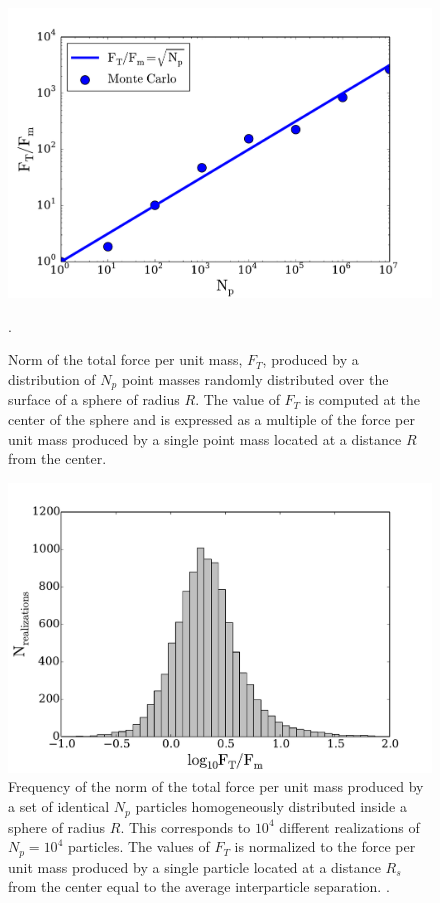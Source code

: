 \documentclass{article}
\begin{document}
\begin{figure}
\begin{center}
\includegraphics[width=0.80\linewidth,angle=0]{spheres_surface.pdf}
\caption{Norm of the total force per unit mass, $F_{T}$, produced by a
  distribution of $N_p$ point masses randomly distributed over the
  surface of a sphere of radius $R$. The value
  of $F_T$ is  computed at the center of the sphere and is  expressed
  as a multiple  of the force per unit mass produced by a  single
  point mass located  at a distance $R$ from the
  center. \label{fig:sphere_surface}}. 
\end{center}
\end{figure}


\begin{figure}
\begin{center}
\includegraphics[width=0.8\linewidth,angle=0]{spheres_bulk.pdf}
\caption{\label{fig:sphere_bulk} Frequency of the norm of the total
  force per unit mass produced by a set of identical $N_p$ particles
  homogeneously distributed inside a sphere of radius $R$. This
  corresponds to $10^4$ different realizations of $N_p=10^4$
  particles. The values of $F_T$ is normalized to the force per unit
  mass produced by a single particle located at a distance $R_s$ from
  the center equal to the average interparticle
  separation. \label{fig:sphere_surface}.}  
\end{center}
\end{figure}
\end{document}

